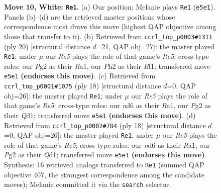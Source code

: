 \documentclass[11pt]{article}
\begin{document}
\begin{figure}[p]
\caption{\textbf{Move 10, White: \texttt{Re1}.} (a) Our position; Melanie plays \texttt{Re1} (\texttt{e5e1}). Panels (b)--(d) are the retrieved master positions whose correspondence most drove this move (highest QAP objective among those that transfer to it). (b) Retrieved from \texttt{ccrl\_top\_p0003\#1311} (ply 20) [structural distance $d$=21, QAP obj=27]: the master played \texttt{Re1}; under $\mu$ our \emph{Re5} plays the role of that game's \emph{Re5}; cross-type roles: our \emph{P}g2 as their \emph{R}a1, our \emph{P}h2 as their \emph{B}f1; transferred move \texttt{e5e1} \textbf{(endorses this move)}. (c) Retrieved from \texttt{ccrl\_top\_p0001\#1075} (ply 18) [structural distance $d$=0, QAP obj=26]: the master played \texttt{Re1}; under $\mu$ our \emph{Re5} plays the role of that game's \emph{Re5}; cross-type roles: our \emph{n}d6 as their \emph{R}a1, our \emph{P}g2 as their \emph{Q}d1; transferred move \texttt{e5e1} \textbf{(endorses this move)}. (d) Retrieved from \texttt{ccrl\_top\_p0002\#784} (ply 18) [structural distance $d$=0, QAP obj=26]: the master played \texttt{Re1}; under $\mu$ our \emph{Re5} plays the role of that game's \emph{Re5}; cross-type roles: our \emph{n}d6 as their \emph{R}a1, our \emph{P}g2 as their \emph{Q}d1; transferred move \texttt{e5e1} \textbf{(endorses this move)}. Synthesis: 16 retrieved analogs transferred to \texttt{Re1} (summed QAP objective 407, the strongest correspondence among the candidate moves); Melanie committed it via the \texttt{search} selector.}
\label{fig:thought-m18}
\end{figure}

\clearpage
\end{document}
